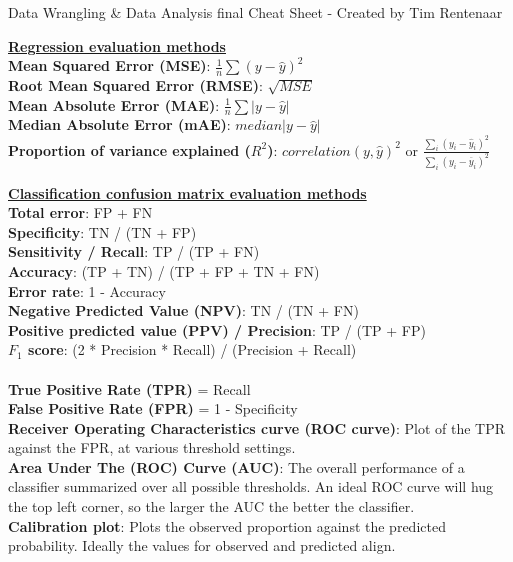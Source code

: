 \documentclass[a4paper,7pt,landscape]{extarticle}
\begin{document}
\begin{multicols}{3} %
\fontsize{6.2pt}{1pt}\selectfont

Data Wrangling \& Data Analysis final Cheat Sheet  - Created by Tim Rentenaar

\begin{boxA}
\underline{\textbf{Regression evaluation methods}}\\
\textbf{Mean Squared Error (MSE)}: $\frac{1}{n} \sum (y-\hat{y})^2$\\
\textbf{Root Mean Squared Error (RMSE)}: $\sqrt{MSE}$\\
\textbf{Mean Absolute Error (MAE)}: $\frac{1}{n} \sum |y-\hat{y}|$\\
\textbf{Median Absolute Error (mAE)}: $median|y-\hat{y}|$\\
\textbf{Proportion of variance explained ($R^2$)}: $correlation(y,\hat{y})^2$ or $\frac{\sum_i (y_i - \hat{y}_i)^2}{\sum_i (y_i - \overline{y}_i)^2}$
\end{boxA}

\begin{boxA}
\underline{\textbf{Classification confusion matrix evaluation methods}}\\
\textbf{Total error}: FP + FN\\
\textbf{Specificity}: TN / (TN + FP)\\
\textbf{Sensitivity / Recall}: TP / (TP + FN)\\
\textbf{Accuracy}: (TP + TN)  / (TP + FP + TN + FN)\\
\textbf{Error rate}: 1 - Accuracy\\
\textbf{Negative Predicted Value (NPV)}: TN / (TN + FN)\\
\textbf{Positive predicted value (PPV) / Precision}: TP / (TP + FP)\\
\textbf{$F_1$ score}: (2 * Precision * Recall) / (Precision + Recall)\\\\
\textbf{True Positive Rate (TPR)} = Recall\\
\textbf{False Positive Rate (FPR)} = 1 - Specificity\\
\textbf{Receiver Operating Characteristics curve (ROC curve)}: Plot of the TPR against the FPR, at various threshold settings.\\
\textbf{Area Under The (ROC) Curve (AUC)}: The overall performance of a classifier summarized over all possible thresholds. An ideal ROC curve will hug the top left corner, so the larger the AUC the better the classifier.\\
\textbf{Calibration plot}: Plots the observed proportion against the predicted probability. Ideally the values for observed and predicted align.
\end{boxA}


\end{multicols}
\end{document}
